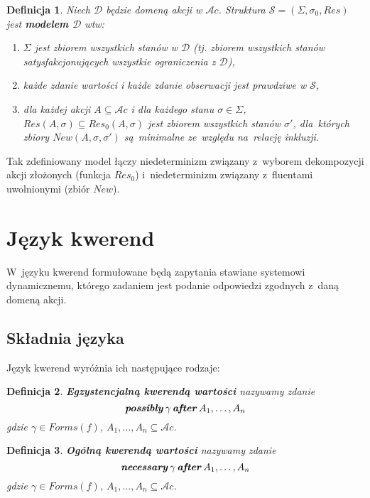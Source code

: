 \documentclass[11pt,a4paper]{article}
\newtheorem{defn}{Definicja}
\DeclareMathOperator{\After}{\textbf{\textit{after}}}
\DeclareMathOperator{\Possibly}{\textbf{\textit{possibly}}}
\DeclareMathOperator{\Necessary}{\textbf{\textit{necessary}}}
\begin{document}
\begin{defn}
    \label{defn:model}
    Niech $\mathcal{D}$ będzie domeną akcji w $\mathcal{A}c$. Struktura $\mathcal{S} = (\Sigma,\sigma_0,Res)$ jest \textbf{modelem $\mathcal{D}$} wtw:
    \begin{enumerate}
    \item $\Sigma$ jest zbiorem wszystkich stanów w $\mathcal{D}$ (tj. zbiorem wszystkich stanów satysfakcjonujących wszystkie ograniczenia z $\mathcal{D}$),
    \item każde zdanie wartości i każde zdanie obserwacji jest prawdziwe w $\mathcal{S}$,
    \item dla każdej akcji $A \subseteq \mathcal{A}c$ i dla każdego stanu $\sigma \in \Sigma$, $Res(A,\sigma) \subseteq Res_0(A,\sigma)$ jest zbiorem wszystkich stanów $\sigma'$, dla~których zbiory $New(A,\sigma,\sigma')$ są~minimalne ze~względu na~relację inkluzji.
    \end{enumerate}
\end{defn}

Tak zdefiniowany model łączy niedeterminizm związany z~wyborem dekompozycji akcji złożonych (funkcja $Res_0$) i~niedeterminizm związany z~fluentami uwolnionymi (zbiór $New$).

\section{Język kwerend}

W~języku kwerend formułowane będą zapytania stawiane systemowi dynamicznemu, którego zadaniem jest podanie odpowiedzi zgodnych z~daną domeną akcji.

\subsection{Składnia języka}
    \label{subsec:query-syntax}
    Język kwerend wyróżnia ich następujące rodzaje:

    \begin{defn}
        \textbf{Egzystencjalną kwerendą wartości} nazywamy zdanie
        $$ \Possibly \gamma \After A_1, \dots, A_n $$
        gdzie $\gamma \in Forms(f)$, $A_1, \dots, A_n \subseteq \mathcal{A}c$.
    \end{defn}

    \begin{defn}
        \textbf{Ogólną kwerendą wartości} nazywamy zdanie
        $$ \Necessary \gamma \After A_1, \dots, A_n $$
        gdzie $\gamma \in Forms(f)$, $A_1, \dots, A_n \subseteq \mathcal{A}c$.
    \end{defn}
\end{document}
